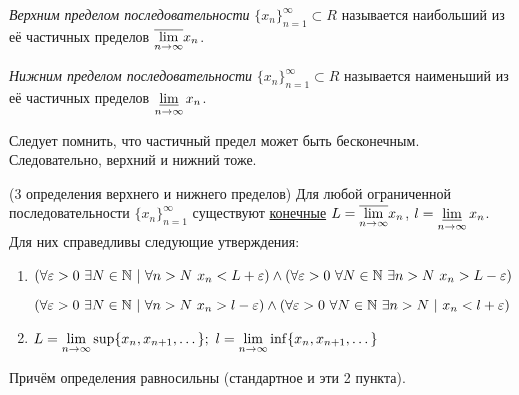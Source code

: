 \begin{definition}
	\textit{Верхним пределом последовательности} $\{x_n\}_{n = 1}^\infty \subset R$ называется наибольший из её частичных пределов $\overline{\lim\limits_{n \rightarrow \infty}} x_n$.
\end{definition}

\begin{definition}
	\textit{Нижним пределом последовательности} $\{x_n\}_{n = 1}^\infty \subset R$ называется наименьший из её частичных пределов $\varliminf\limits_{n \rightarrow \infty} x_n$.
\end{definition}

\begin{anote}
	Следует помнить, что частичный предел может быть бесконечным. Следовательно, верхний и нижний тоже.
\end{anote}

\begin{theorem} (3 определения верхнего и нижнего пределов)
	Для любой ограниченной последовательности $\{x_n\}_{n = 1}^\infty$ существуют \underline{конечные} $L = \overline{\lim\limits_{n \to \infty}} x_n$, $l = \varliminf\limits_{n \to \infty} x_n$. Для них справедливы следующие утверждения:
	\begin{enumerate}
		\item $(\forall \eps > 0\ \exists N \in \N\ |\ \forall n > N\ x_n < L + \eps) \wedge (\forall \eps > 0\ \forall N \in \N\ \exists n > N\ x_n > L - \eps)$
		
		$(\forall \eps > 0\ \exists N \in \N\ |\ \forall n > N\ x_n > l - \eps) \wedge (\forall \eps > 0\ \forall N \in \N\ \exists n > N\ |\ x_n < l + \eps)$
		
		\item $L = \lim\limits_{n \to \infty} \sup \{x_n, x_{n + 1}, \dots\};\ l = \lim\limits_{n \to \infty} \inf \{x_n, x_{n + 1}, \dots\}$
	\end{enumerate}
	Причём определения равносильны (стандартное и эти 2 пункта).
\end{theorem}

